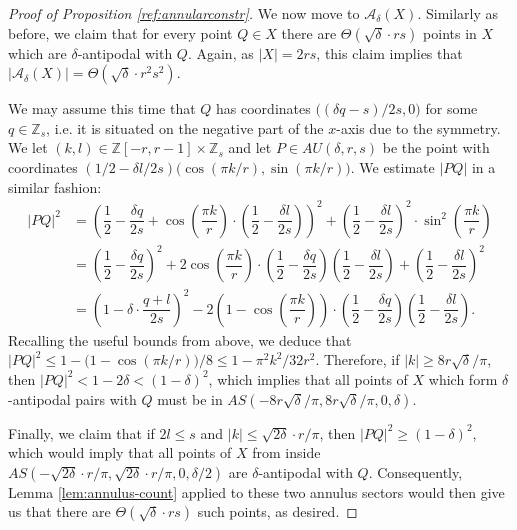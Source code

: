 \documentclass[12pt]{article}
\begin{document}
\begin{proof}[Proof of Proposition \ref{ref:annularconstr}]
We now move to $\mathcal{A}_\delta(X)$. Similarly as before, we claim that for every point $Q\in X$ there are $\Theta\left(\sqrt{\delta}\cdot rs\right)$ points in $X$ which are $\delta$-antipodal with $Q$. Again, as $|X|=2rs$, this claim implies that $|\mathcal{A}_\delta(X)|=\Theta\left(\sqrt{\delta}\cdot r^2s^2\right)$.

We may assume this time that $Q$ has coordinates $\big((\delta q-s)/2s,0\big)$ for some $q\in \mathbb{Z}_s$, i.e. it is situated on the negative part of the $x$-axis due to the symmetry. We let $(k,l)\in \mathbb{Z}[-r,r-1]\times \mathbb{Z}_s$ and let $P\in AU(\delta,r,s)$ be the point with coordinates
$(1/2-\delta l/2s)\big(\cos(\pi k/r),\sin(\pi k/r)\big)$. We estimate $|PQ|$ in a similar fashion: 
 \begin{align*}
        |PQ|^2 &= \left(\dfrac{1}{2}-\dfrac{\delta q}{2s}+\cos\left(\dfrac{\pi k}{r}\right)\cdot \left(\dfrac{1}{2}-\dfrac{\delta l}{2s}\right)\right)^2 +\left(\dfrac{1}{2}-\dfrac{\delta l}{2s}\right)^2\cdot \sin^2\left(\dfrac{\pi k}{r}\right) \\
         &=  \left(\dfrac{1}{2}-\dfrac{\delta q}{2s}\right)^2 + 2\cos\left(\dfrac{\pi k}{r}\right)\cdot \left(\dfrac{1}{2}-\dfrac{\delta q}{2s}\right)\left(\dfrac{1}{2}-\dfrac{\delta l}{2s}\right) + \left(\dfrac{1}{2}-\dfrac{\delta l}{2s}\right)^2\\
         &= \left(1-\delta\cdot \dfrac{q+l}{2s}\right)^2  - 2\left(1-\cos\left(\dfrac{\pi k}{r}\right)\right)\cdot \left(\dfrac{1}{2}-\dfrac{\delta q}{2s}\right)\left(\dfrac{1}{2}-\dfrac{\delta l}{2s}\right).
    \end{align*}
  \indent Recalling the useful bounds from above, we deduce that $|PQ|^2\leq 1-\big(1-\cos(\pi k/r)\big)/8\leq 1-\pi^2k^2/32r^2$. Therefore, if $|k|\geq 8r\sqrt{\delta}/\pi$, then $|PQ|^2< 1-2\delta<(1-\delta)^2$, which implies that all points of $X$ which form $\delta$-antipodal pairs with $Q$ must be in $AS(-8r\sqrt{\delta}/\pi,8r\sqrt{\delta}/\pi,0,\delta)$.  

 Finally, we claim that if $2l\leq s$ and $|k|\leq \sqrt{2\delta}\cdot r/\pi$, then $|PQ|^2\geq (1-\delta)^2$, which would imply that all points of $X$ from inside $AS(-\sqrt{2\delta}\cdot r/\pi,\sqrt{2\delta}\cdot r/\pi,0,\delta/2)$ are $\delta$-antipodal with $Q$. Consequently, Lemma \ref{lem:annulus-count} applied to these two annulus sectors would then give us that there are $\Theta\left(\sqrt{\delta}\cdot rs\right)$ such points, as desired.


\end{proof}
\end{document}
